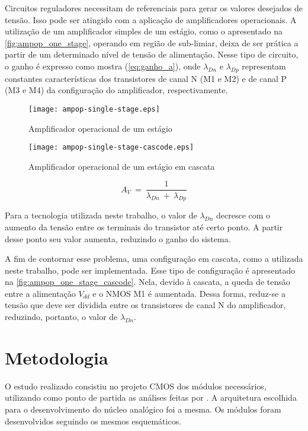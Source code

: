 Circuitos reguladores necessitam de referenciais para gerar os valores desejados de tensão. Isso pode ser atingido com a aplicação de amplificadores operacionais. A utilização de um amplificador simples de um estágio, como o apresentado na \autoref{fig:ampop_one_stage}, operando em região de sub-limiar, deixa de ser prática a partir de um determinado nível de tensão de alimentação. Nesse tipo de circuito, o ganho é expresso como mostra (\ref{eq:ganho_a}), onde $\lambda_{Dn}$ e $\lambda_{Dp}$ representam constantes características dos transistores de canal N ({M1} e {M2}) e de canal P ({M3} e {M4}) da configuração do amplificador, respectivamente.

\begin{figure}[!htb]
	\caption{\label{fig:ampop_one_stage}Amplificador operacional de um estágio}
	\begin{center}
		\texttt{[image: ampop-single-stage.eps]}
	\end{center}
\end{figure}

\begin{figure}[!htb]
	\caption{\label{fig:ampop_one_stage_cascode}Amplificador operacional de um estágio em cascata}
	\begin{center}
		\texttt{[image: ampop-single-stage-cascode.eps]}
	\end{center}
\end{figure}

\begin{equation}
	\label{eq:ganho_a}
	A_V~=~\dfrac{1}{\lambda_{Dn}~+~\lambda_{Dp}}
\end{equation}

Para a tecnologia utilizada neste trabalho, o valor de $\lambda_{Dn}$ decresce com o aumento da tensão entre os terminais do transistor até certo ponto. A partir desse ponto seu valor aumenta, reduzindo o ganho do sistema.

A fim de contornar esse problema, uma configuração em cascata, como a utilizada neste trabalho, pode ser implementada. Esse tipo de configuração é apresentado na \autoref{fig:ampop_one_stage_cascode}. Nela, devido à cascata, a queda de tensão entre a alimentação $V_{dd}$ e o NMOS {M1} é aumentada. Dessa forma, reduz-se a tensão que deve ser dividida entre os transistores de canal N do amplificador, reduzindo, portanto, o valor de $\lambda_{Dn}$.


\section{Metodologia}
O estudo realizado consistiu no projeto CMOS dos módulos necessários, utilizando como ponto de partida as análises feitas por . A arquitetura escolhida para o desenvolvimento do núcleo analógico foi a mesma. Os módulos foram desenvolvidos seguindo os mesmos esquemáticos.

